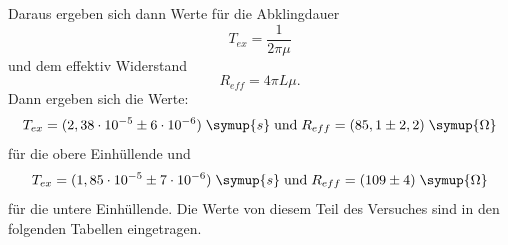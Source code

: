   Daraus ergeben sich dann Werte für die Abklingdauer
  \begin{equation*}
    T_{ex} = \frac{1}{2\pi\mu}
  \end{equation*}
  und dem effektiv Widerstand
  \begin{equation*}
    R_{eff} = 4\pi L \mu.
  \end{equation*}
Dann ergeben sich die Werte:
\begin{equation*}
  T_{ex}=(2,38\cdot 10^{-5} \pm 6\cdot 10 ^{-6})\; \symup{s} \; \text{und} \;
  R_{eff} = (85,1 \pm 2,2) \;\symup{\Omega}
\end{equation*}
für die obere Einhüllende und
\begin{equation*}
  T_{ex}=(1,85\cdot 10^{-5} \pm 7\cdot 10 ^{-6})\; \symup{s} \; \text{und} \;
  R_{eff} = (109 \pm 4) \;\symup{\Omega}
\end{equation*}
für die untere Einhüllende. Die Werte von diesem Teil des Versuches sind in den
folgenden Tabellen eingetragen.
